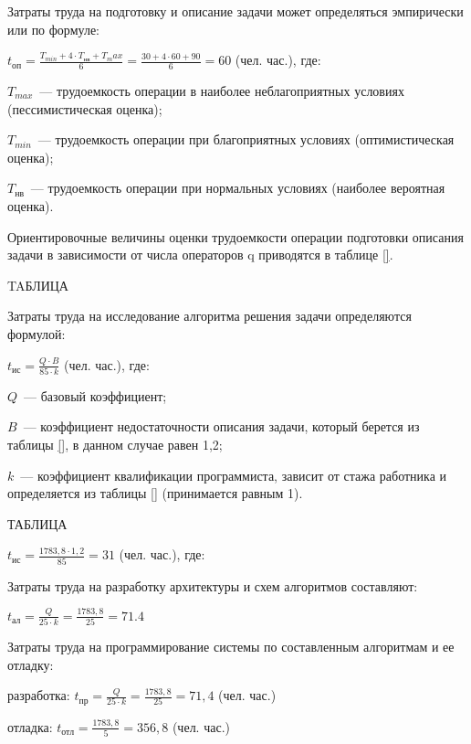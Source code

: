 Затраты труда на подготовку и описание задачи может определяться эмпирически или по формуле:

\begin{center}
$ t_\text{оп} = \frac{T_{min} + 4 \cdot T_\text{нв} + T_max}{6} = \frac{30 + 4 \cdot 60 + 90}{6} = 60$ (чел. час.), где:
\end{center}

$T_{max}$~--- трудоемкость операции в наиболее неблагоприятных условиях (пессимистическая оценка);

$T_{min}$~--- трудоемкость операции при благоприятных условиях (оптимистическая оценка); 

$T_\text{нв}$~--- трудоемкость операции при нормальных  условиях (наиболее вероятная оценка).

Ориентировочные величины оценки трудоемкости операции подготовки описания задачи в зависимости от числа операторов q приводятся в таблице \ref{}.

TAБЛИЦА

Затраты труда на исследование алгоритма решения задачи определяются формулой:
\begin{center}
$ t_\text{ис} = \frac{Q \cdot B}{85 \cdot k}$ (чел. час.), где:
\end{center}

$Q$~--- базовый коэффициент;

$B$~--- коэффициент недостаточности описания задачи, который берется из таблицы \ref{}, в данном случае равен 1,2;

$k$~--- коэффициент квалификации программиста, зависит от стажа работника и определяется из таблицы \ref{} (принимается равным 1).

ТАБЛИЦА

\begin{center}
$ t_\text{ис} = \frac{1783,8 \cdot 1,2}{85} = 31$ (чел. час.), где:
\end{center}

Затраты труда на разработку архитектуры и схем алгоритмов составляют:

\begin{center}
$ t_\text{ал} = \frac{Q}{25 \cdot k} = \frac{1783,8}{25} = 71.4 $
\end{center}

Затраты труда на программирование системы по составленным алгоритмам и ее отладку:

разработка: $ t_\text{пр} = \frac{Q}{25 \cdot k} = \frac{1783,8}{25} = 71,4 $ (чел. час.)

отладка: $ t_\text{отл} = \frac{1783,8}{5} = 356,8 $ (чел. час.)

